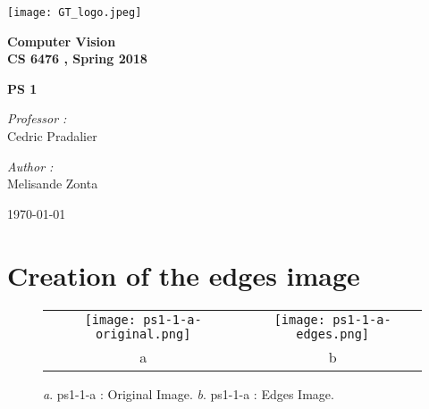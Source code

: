 \documentclass[a4paper,11pt]{article}
\begin{document}

\begin{titlepage}

\begin{center}
\texttt{[image: GT\_logo.jpeg]}
\end{center}
\hrulefill
\begin{center}\bfseries\huge
   Computer Vision \\
   CS 6476 , Spring 2018\\
   \end{center}
  \begin{center}\bfseries\large
     PS 1\\
    \hrulefill
\end{center}
\vspace*{1cm}
\begin{minipage}[t]{0.6\textwidth}
  \begin{flushleft} \large
    \emph{Professor : }\\
    Cedric Pradalier \\
  \end{flushleft}
\end{minipage}
\begin{minipage}[t]{0.3\textwidth}
  \begin{flushright} \large
    \emph{Author :} \\
    Melisande Zonta \\
  \end{flushright}
\end{minipage}
\begin{flushright}
       \today 
\end{flushright} 
\end{titlepage}

\tableofcontents
\clearpage

\section{Creation of the edges image}



 \begin{figure}[H]
\begin{center}
\begin{tabular}{cc}
	\texttt{[image: ps1-1-a-original.png]}&
	\texttt{[image: ps1-1-a-edges.png]}\\
	a&b
\end{tabular}
\end{center}
\caption{ 
\textit{a}. ps1-1-a : Original Image. \textit{b}. ps1-1-a : Edges Image.}
\label{ps1-1-a}
\end{figure}
\end{document}
